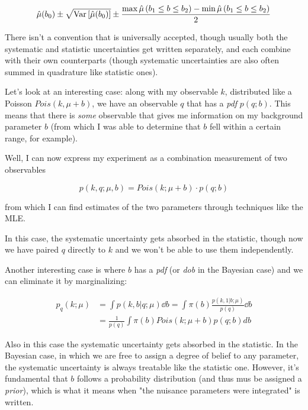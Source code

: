 	\[
	\hat\mu(b_0)\pm \sqrt{\operatorname{Var}\left[\hat\mu(b_0)\right]}\pm\frac{\max \hat\mu\left(b_1\leq b \leq b_2\right)-\min\hat\mu\left(b_1\leq b \leq b_2\right)}{2}
	\]

There isn't a convention that is universally accepted, though usually both the systematic and statistic uncertainties get written separately, and each combine with their own counterparts (though systematic uncertainties are also often summed in quadrature like statistic ones). 

\begin{example}
	Let's look at an interesting case: along with my observable $k$, distributed like a Poisson $Pois(k,\mu+b)$, we have an observable $q$ that has a \emph{pdf} $p(q;b)$. This means that there is \emph{some} observable that gives me information on my background parameter $b$ (from which I was able to determine that $b$ fell within a certain range, for example). 
	
	Well, I can now express my experiment as a combination measurement of two observables
	
	\[
	p(k,q;\mu,b) = Pois(k;\mu+b)\cdot p(q;b)
	\]
	
	from which I can find estimates of the two parameters through techniques like the MLE. 
	
	In this case, the systematic uncertainty gets absorbed in the statistic, though now we have paired $q$ directly to $k$ and we won't be able to use them independently. 
\end{example}

\begin{example}
	Another interesting case is where $b$ has a \emph{pdf} (or \emph{dob} in the Bayesian case) and we can eliminate it by marginalizing:
	
	\begin{align*}
	p_q(k;\mu) &= \int p(k,b|q;\mu)\dd b = \int \pi(b)\frac{p(k,1|b;\mu)}{p(q)}\dd b\\
	&= \frac{1}{p(q)}\int \pi(b) Pois(k;\mu+b)p(q;b)db
	\end{align*}
	
	Also in this case the systematic uncertainty gets absorbed in the statistic. In the Bayesian case, in which we are free to assign a degree of belief to any parameter, the systematic uncertainty is always treatable like the statistic one. However, it's fundamental that $b$ follows a probability distribution (and thus mus be assigned a \emph{prior}), which is what it means when "the nuisance parameters were integrated" is written.
\end{example}


